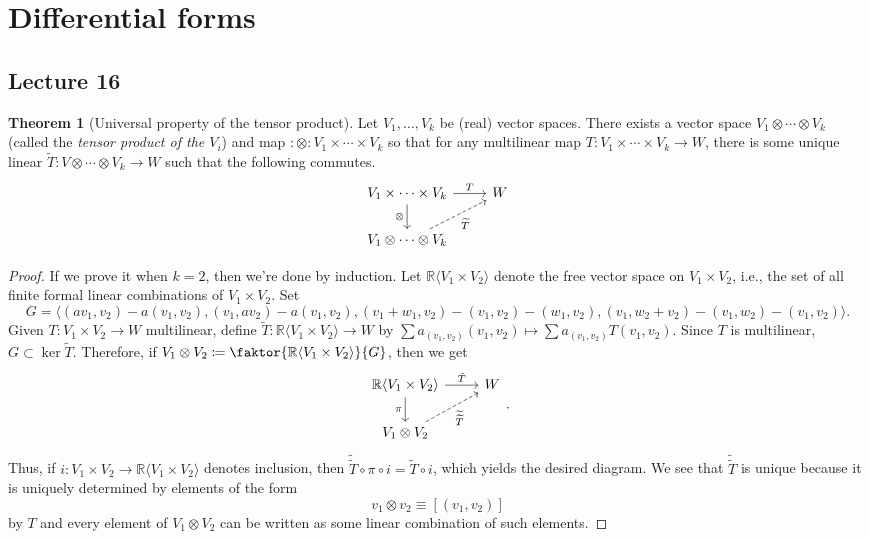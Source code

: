 \documentclass[10pt,letterpaper,cm]{nupset}
\theoremstyle{definition}
\theoremstyle{theorem}
\newtheorem{theorem}[definition]{Theorem}
\theoremstyle{remark}
\newcommand{\R}{\mathbb R}
\newcommand{\1}{\mathbf{1}}
\newcommand{\0}{\vec 0}
\begin{document}
\section{Differential forms}

\subsection{Lecture 16}

\begin{theorem}[Universal property of the tensor product]
Let $V_1, \ldots, V_k$ be (real) vector spaces. There exists a vector space $V_1 \otimes \cdots \otimes V_k$ (called the \textit{tensor product of the $V_i$}) and map $:\otimes : V_1\times \cdots \times V_k$ so that for any multilinear map $T: V_1 \times \cdots \times V_k \to W$, there is some unique linear $\widetilde{T} : V \otimes \cdots \otimes V_k \to W$ such that the following commutes.
\[
\begin{tikzcd}
V_1 \times \cdots \times V_k \arrow[d, "\otimes"'] \arrow[r, "T"] & W \\
V_1 \otimes \cdots \otimes V_k \arrow[ru, "\widetilde{T}"', dashed] & 
\end{tikzcd}
\]
\end{theorem}
\begin{proof}
If we prove it when $k=2$, then we're done by induction. Let $\R\langle V_1 \times V_2 \rangle$ denote the free vector space on $V_1 \times V_2$, i.e., the set of all finite formal linear combinations of $V_1 \times V_2$. Set $$G = \langle (av_1, v_2) - a(v_1, v_2), (v_1, av_2) - a(v_1, v_2), (v_1 + w_1, v_2) - (v_1, v_2)-(w_1, v_2), (v_1, w_2 + v_2) - (v_1, w_2) -(v_1, v_2)\rangle.$$
Given $T: V_1 \times V_2 \to W$ multilinear, define $\widetilde{T} : \R\langle V_1 \times V_2\rangle \to W$ by $\sum a_{(v_1, v_2)}(v_1, v_2) \mapsto \sum a_{(v_1, v_2)} T(v_1, v_2)$. Since $T$ is multilinear, $G \subset \ker \widetilde{T}$. Therefore, if $V_1 \otimes V_2 \coloneqq  \faktor{\R\langle V_1 \times V_2 \rangle}{G}$, then we get 
\[
\begin{tikzcd}
\R\langle V_1 \times V_2 \rangle \arrow[d, "\pi"'] \arrow[r, "\tilde{T}"] & W \\
V_1 \otimes V_2 \arrow[ru, "\widetilde{\widetilde{T}}"', dashed] & 
\end{tikzcd}.
\]
Thus, if $i: V_1 \times V_2 \to \R\langle V_1 \times V_2 \rangle$ denotes inclusion, then $\widetilde{\widetilde{T}} \circ \pi \circ i = \widetilde{T} \circ i$, which yields the desired diagram. We see that $\widetilde{\widetilde{T}}$ is unique because it is uniquely determined by elements of the form $$v_1 \otimes v_2\equiv \left[(v_1, v_2)\right]$$ by $T$ and every element of $V_1 \otimes V_2$ can be written as some linear combination of such elements.
\end{proof}
\end{document}
